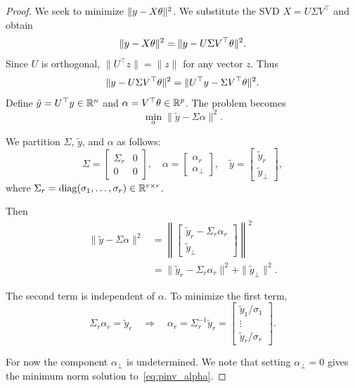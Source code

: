\begin{proof}
We seek to minimize $\|y - X\theta\|^2$. We substitute the SVD $X = U\Sigma V^\top$ and obtain
$$\|y - X\theta\|^2 = \|y - U\Sigma V^\top\theta\|^2.$$
Since $U$ is orthogonal, $\|U^\top z\| = \|z\|$ for any vector $z$. 
Thus
$$\|y - U\Sigma V^\top\theta\|^2 = \|U^\top y - \Sigma V^\top\theta\|^2.$$
Define $\tilde{y} = U^\top y \in \mathbb{R}^n$ and $\alpha = V^\top\theta \in \mathbb{R}^p$. 
The problem becomes
\begin{equation}\label{eq:pinv_alpha}
\min_{\alpha} \|\tilde{y} - \Sigma\alpha\|^2.
\end{equation}

We partition $\Sigma$, $\tilde{y}$, and $\alpha$ as follows:
$$\Sigma = \begin{bmatrix} \Sigma_r & 0 \\ 0 & 0 \end{bmatrix}, \quad
\alpha = \begin{bmatrix} \alpha_r \\ \alpha_{\perp} \end{bmatrix}, \quad
\tilde{y} = \begin{bmatrix} \tilde{y}_r \\ \tilde{y}_{\perp} \end{bmatrix},$$
where $\Sigma_r = \operatorname{diag}(\sigma_1, \ldots, \sigma_r) \in \mathbb{R}^{r \times r}$.

Then
\begin{align*}
  \|\tilde{y} - \Sigma\alpha\|^2
  &= \left\|\begin{bmatrix} \tilde{y}_r - \Sigma_r\alpha_r \\ \tilde{y}_{\perp} \end{bmatrix}\right\|^2\\
  &= \|\tilde{y}_r - \Sigma_r\alpha_r\|^2 + \|\tilde{y}_{\perp}\|^2.
\end{align*}

The second term is independent of $\alpha$. To minimize the first term,
$$\Sigma_r\alpha_r = \tilde{y}_r \quad \Rightarrow \quad 
\alpha_r = \Sigma_r^{-1}\tilde{y}_r 
= \begin{bmatrix} \tilde{y}_1/\sigma_1 \\ \vdots \\ \tilde{y}_r/\sigma_r \end{bmatrix}.$$

For now the component $\alpha_{\perp}$ is undetermined. We note that setting 
$\alpha_{\perp} = 0$ gives the minimum norm solution to~\eqref{eq:pinv_alpha}.


\end{proof}
